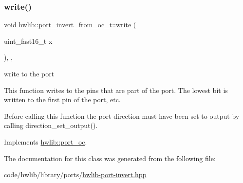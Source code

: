 \subsubsection{\texorpdfstring{write()}{write()}}
{\footnotesize\ttfamily void hwlib\+::port\+\_\+invert\+\_\+from\+\_\+oc\+\_\+t\+::write (\begin{DoxyParamCaption}\item[{uint\+\_\+fast16\+\_\+t}]{x }\end{DoxyParamCaption})\hspace{0.3cm}{\ttfamily [inline]}, {\ttfamily [override]}, {\ttfamily [virtual]}}





write to the port

This function writes to the pins that are part of the port. The lowest bit is written to the first pin of the port, etc.

Before calling this function the port direction must have been set to output by calling direction\+\_\+set\+\_\+output(). 

Implements \hyperlink{classhwlib_1_1port__oc_aa5889aedda709f045730db9859e4fcf4}{hwlib\+::port\+\_\+oc}.



The documentation for this class was generated from the following file\+:\begin{DoxyCompactItemize}
\item 
code/hwlib/library/ports/\hyperlink{hwlib-port-invert_8hpp}{hwlib-\/port-\/invert.\+hpp}\end{DoxyCompactItemize}
